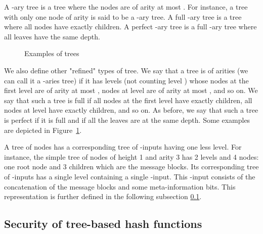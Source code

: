 \documentclass{llncs}
\begin{document}
A -ary tree is a tree where the nodes are of arity at most . For instance, a tree with only one node of arity  is said to be a -ary tree. 
A full -ary tree is a tree where all nodes have exactly  children.
A perfect -ary tree is a full -ary tree where all leaves have the same depth.

\begin{figure}[htb]
\centering
{}
\vspace{0.75cm}

\vspace{0.75cm}

\caption{Examples of trees}
\label{Tree_examples}
\end{figure}


\begin{sloppypar}
We also define other "refined" types of tree. 
We say that a tree is of arities  (we can call it a -aries tree) if 
it has  levels (not counting level ) whose nodes at the first level are
of arity at most , nodes at level  are of arity at most , and so on. We say that such a tree is full 
if all nodes at the first level have exactly  children, all nodes at level  have exactly  children, and so on. 
As before, we say that such a tree is perfect if it is full and if all the leaves are at the same depth.
Some examples are depicted in Figure~\ref{Tree_examples}.
\end{sloppypar}

A tree of nodes has a corresponding tree of -inputs having one less level. For instance, the simple tree of nodes of height 1 and arity 3 has 2 levels and 4 nodes: 
one root node and 3 children which are the message blocks. Its corresponding tree of -inputs has a single level containing a single -input. This -input consists
of the concatenation of the message blocks and some meta-information bits. This representation is further defined in the following subsection \ref{three_conditions}.

\subsection{Security of tree-based hash functions}\label{three_conditions}
\end{document}

